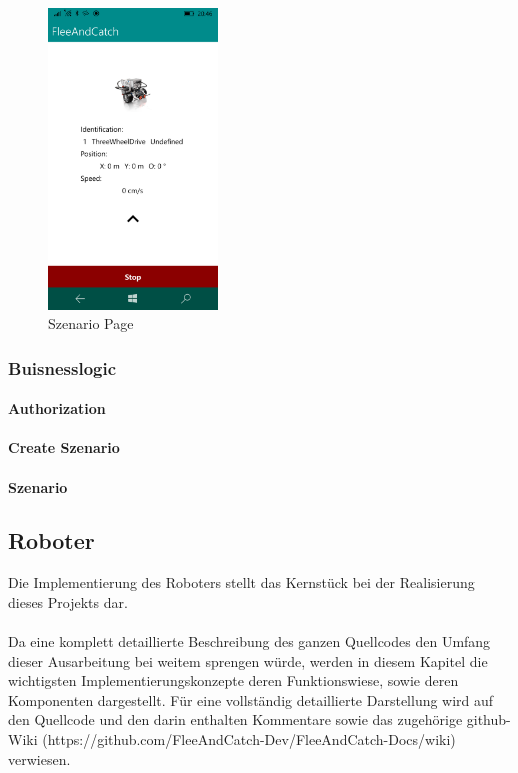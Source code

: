 \begin{figure}[h]
	\begin{center}
		\includegraphics[width=0.4\textwidth]{images/implementation/szenario.png}
	\end{center}	
	\caption{Szenario Page}
	\label{fig:szenario}
\end{figure}

\newpage
\subsubsection{Buisnesslogic} %

\paragraph{Authorization}

\paragraph{Create Szenario}

\paragraph{Szenario}

\newpage

\subsection{Roboter}
Die Implementierung des Roboters stellt das Kernstück bei der Realisierung dieses Projekts dar. 
\\
\\
Da eine komplett detaillierte Beschreibung des ganzen Quellcodes den Umfang dieser Ausarbeitung bei weitem sprengen würde,
werden in diesem Kapitel die wichtigsten Implementierungskonzepte deren Funktionswiese, sowie deren Komponenten dargestellt. 
Für eine vollständig detaillierte Darstellung wird auf den Quellcode und den darin enthalten Kommentare sowie das zugehörige 
github-Wiki (https://github.com/FleeAndCatch-Dev/FleeAndCatch-Docs/wiki) verwiesen.
